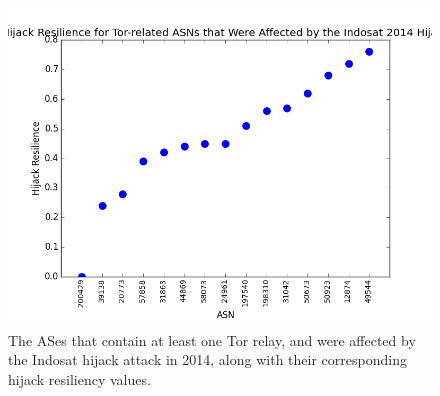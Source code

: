 \begin{figure}
\centering
\includegraphics[width=.4\textwidth]{case_study_graph}
\caption{The ASes that contain at least one Tor relay, and were affected by the Indosat hijack attack in 2014, along with their corresponding hijack resiliency values.}
\label{fig:case_study}
\end{figure}
